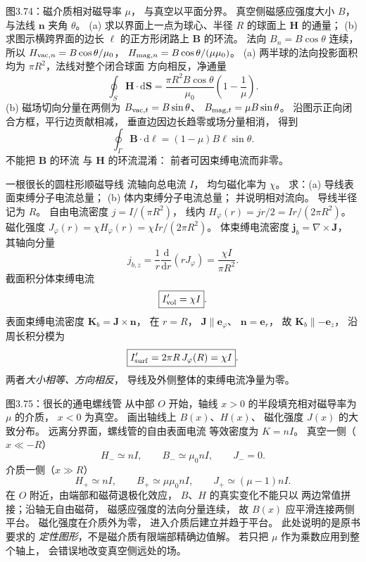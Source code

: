 图3.74：磁介质相对磁导率 $\mu$，
与真空以平面分界。
真空侧磁感应强度大小 $B$，
与法线 $\bm n$ 夹角 $\theta$。
(a) 求以界面上一点为球心、半径 $R$
的球面上 $\bm H$ 的通量；
(b) 求图示横跨界面的边长 $\ell$
的正方形闭路上 $\bm B$ 的环流。
\exsolution
法向 $B_n=B\cos\theta$ 连续，
所以
$H_{{\rm vac},n}=B\cos\theta/\mu_0$，
$H_{{\rm mag},n}=B\cos\theta/(\mu\mu_0)$。
(a) 两半球的法向投影面积均为
$\pi R^2$，法线对整个闭合球面
方向相反，净通量
\[
\boxed{\oint_S\bm H\cdot\mathrm d\bm S
=\frac{\pi R^2B\cos\theta}{\mu_0}
\left(1-\frac1\mu\right)}.
\]
(b) 磁场切向分量在两侧为
$B_{{\rm vac},t}=B\sin\theta$、
$B_{{\rm mag},t}=\mu B\sin\theta$。
沿图示正向闭合方框，平行边贡献相减，
垂直边因边长趋零或场分量相消，
得到
\[
\boxed{\oint_\Gamma\bm B\cdot\mathrm d\bm\ell
=(1-\mu)B\ell\sin\theta}.
\]
\excheck 不能把 $\bm B$ 的环流
与 $\bm H$ 的环流混淆：
前者可因束缚电流而非零。

一根很长的圆柱形顺磁导线
流轴向总电流 $I$，
均匀磁化率为 $\chi$。
求：(a) 导线表面束缚分子电流总量；
(b) 体内束缚分子电流总量；
并说明相对流向。
\exsolution
导线半径记为 $R$。
自由电流密度
$j=I/(\pi R^2)$，
线内
$H_\varphi(r)=jr/2=Ir/(2\pi R^2)$。
磁化强度
$J_\varphi(r)=\chi H_\varphi(r)
=\chi I r/(2\pi R^2)$。
体束缚电流密度
$\bm j_b=\nabla\times\bm J$，
其轴向分量
\[
j_{b,z}=\frac1r\frac{\mathrm d}{\mathrm dr}
(rJ_\varphi)
=\frac{\chi I}{\pi R^2}.
\]
截面积分体束缚电流
\[
\boxed{I'_{\rm vol}=\chi I}.
\]
表面束缚电流密度
$\bm K_b=\bm J\times\bm n$，
在 $r=R$，
$\bm J\parallel\bm e_\varphi$、
$\bm n=\bm e_r$，
故 $\bm K_b\parallel-\bm e_z$，
沿周长积分模为
\[
\boxed{I'_{\rm surf}=
2\pi R\,J_\varphi(R)=\chi I}.
\]
\excheck 两者\emph{大小相等、方向相反}，
导线及外侧整体的束缚电流净量为零。

图3.75：很长的通电螺线管
从中部 $O$ 开始，轴线 $x>0$
的半段填充相对磁导率为 $\mu$ 的介质，
$x<0$ 为真空。
画出轴线上 $B(x)$、$H(x)$、
磁化强度 $J(x)$ 的大致分布。
\exsolution
远离分界面，螺线管的自由表面电流
等效密度为 $K=nI$。
真空一侧（$x\ll-R$）
\[
\boxed{H_-\simeq nI,\qquad
B_-\simeq\mu_0nI,\qquad J_-=0}.
\]
介质一侧（$x\gg R$）
\[
\boxed{H_+\simeq nI,\qquad
B_+\simeq\mu\mu_0nI,\qquad
J_+\simeq(\mu-1)nI}.
\]
在 $O$ 附近，由端部和磁荷退极化效应，
$B$、$H$ 的真实变化不能只以
两边常值拼接；沿轴无自由磁荷，
磁感应强度的法向分量连续，
故 $B(x)$ 应平滑连接两侧平台。
磁化强度在介质外为零，
进入介质后建立并趋于平台。
\excheck 此处说明的是原书要求的
\emph{定性图形}，不是磁介质有限端部精确边值解。
若只把 $\mu$ 作为乘数应用到整个轴上，
会错误地改变真空侧远处的场。

